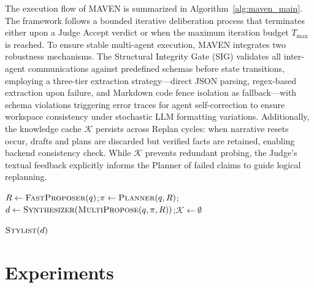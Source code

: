 \documentclass{article}
\begin{document}
The execution flow of MAVEN is summarized in Algorithm~\ref{alg:maven_main}. The framework follows a bounded iterative deliberation process that terminates either upon a Judge Accept verdict or when the maximum iteration budget $T_{\max}$ is reached. To ensure stable multi-agent execution, MAVEN integrates two robustness mechanisms. The Structural Integrity Gate (SIG) validates all inter-agent communications against predefined schemas before state transitions, employing a three-tier extraction strategy—direct JSON parsing, regex-based extraction upon failure, and Markdown code fence isolation as fallback—with schema violations triggering error traces for agent self-correction to ensure workspace consistency under stochastic LLM formatting variations. Additionally, the knowledge cache $\mathcal{K}$ persists across Replan cycles: when narrative resets occur, drafts and plans are discarded but verified facts are retained, enabling backend consistency check. While $\mathcal{K}$ prevents redundant probing, the Judge's textual feedback explicitly informs the Planner of failed claims to guide logical replanning.

\begin{algorithm}[t]
  \caption{MAVEN Deliberation Workflow}
  \label{alg:maven_main}
  \DontPrintSemicolon

  
  $R \gets \textsc{FastProposer}(q)$;\enspace $\pi \gets \textsc{Planner}(q, R)$;\enspace $d \gets \textsc{Synthesizer}(\textsc{MultiPropose}(q, \pi, R))$;\enspace $\mathcal{K} \gets \emptyset$\;
  
  \Return $\textsc{Stylist}(d)$\;
\end{algorithm}

\section{Experiments}
\label{sec:experiments}
\end{document}
